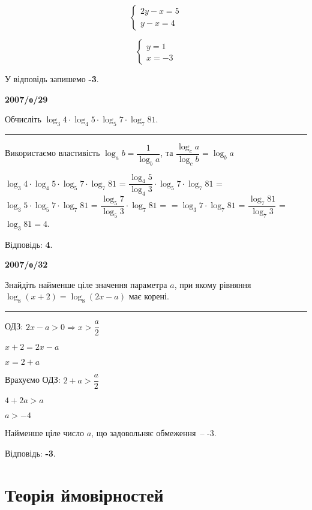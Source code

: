 \documentclass[12pt,a4paper]{article}  %
\begin{document}
\begin{equation*}
\begin{cases}
   2y-x=5\\
   y-x=4
\end{cases}
\end{equation*}

\begin{equation*}
\begin{cases}
	y=1\\
	x=-3
\end{cases}
\end{equation*}

У відповідь запишемо \textbf{-3}.

\vspace{20pt}
\par\medskip \textbf{2007/о/29}\par
Обчисліть $\log_3 4 \cdot \log_{4} 5 \cdot \log_{5} 7 \cdot \log_7 81$.

\noindent\rule[0.5ex]{\linewidth}{1pt}

Використаємо властивість $\log_a b = \dfrac{1}{\log_{b} a}$, та $\dfrac{\log_c a}{\log_c b}=\log_b a$

$\log_3 4 \cdot \log_{4} 5 \cdot \log_{5} 7 \cdot \log_7 81$ = $\dfrac{\log_4 5}{\log_4 3} \cdot \log_{5} 7 \cdot \log_7 81$ = $\log_{3} 5 \cdot \log_{5} 7 \cdot \log_7 81$ = $\dfrac{\log_5 7}{\log_5 3} \cdot \log_7 81$ = $=\log_3 7 \cdot \log_7 81$ = $\dfrac{\log_7 81}{\log_7 3}$ = $\log_3 81 = 4$.

Відповідь: \textbf{4}.

\vspace{20pt}
\par\medskip \textbf{2007/о/32}\par

Знайдіть найменше ціле значення параметра $a$, при якому рівняння $\log_8{(x+2)}=\log_8{(2x-a)}$ має корені.

\noindent\rule[0.5ex]{\linewidth}{1pt}

ОДЗ: $2x-a>0 \Rightarrow x > \dfrac{a}{2}$

$x+2=2x-a$

$x = 2+a$

Врахуємо ОДЗ: $2+a>\dfrac{a}{2}$

$4+2a>a$

$a > -4$

Найменше ціле число $a$, що задовольняє обмеження~-- -3.

Відповідь: \textbf{-3}.

\newpage
\section{Теорія ймовірностей}
\end{document}
